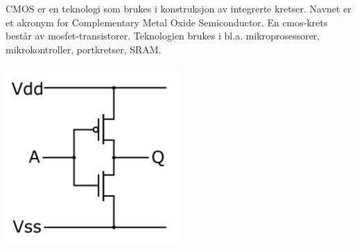 CMOS er en teknologi som brukes i konstruksjon av integrerte kretser.
Navnet er et akronym for Complementary Metal Oxide Semiconductor.
En cmos-krets består av mosfet-transistorer.
Teknologien brukes i bl.a. mikroprosessorer, mikrokontroller, portkretser, SRAM.
\\\\
\includegraphics[width=0.5\textwidth]{./img/cmos-inverter}
